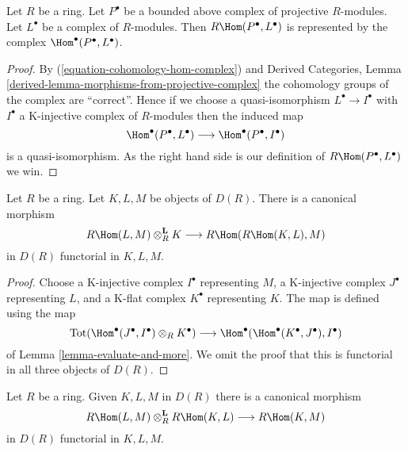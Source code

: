 \begin{lemma}
\label{lemma-RHom-out-of-projective}
Let $R$ be a ring. Let $P^\bullet$ be a bounded above complex
of projective $R$-modules. Let $L^\bullet$ be a complex of $R$-modules.
Then $R\Hom(P^\bullet, L^\bullet)$ is represented by the complex
$\Hom^\bullet(P^\bullet, L^\bullet)$.
\end{lemma}

\begin{proof}
By (\ref{equation-cohomology-hom-complex}) and
Derived Categories, Lemma \ref{derived-lemma-morphisms-from-projective-complex}
the cohomology groups of the complex are ``correct''.
Hence if we choose a quasi-isomorphism $L^\bullet \to I^\bullet$
with $I^\bullet$ a K-injective complex of $R$-modules
then the induced map
$$
\Hom^\bullet(P^\bullet, L^\bullet)
\longrightarrow
\Hom^\bullet(P^\bullet, I^\bullet)
$$
is a quasi-isomorphism. As the right hand side is our definition
of $R\Hom(P^\bullet, L^\bullet)$ we win.
\end{proof}

\begin{lemma}
\label{lemma-internal-hom-evaluate}
Let $R$ be a ring. Let $K, L, M$ be objects of $D(R)$.
There is a canonical morphism
$$
R\Hom(L, M) \otimes_R^\mathbf{L} K
\longrightarrow
R\Hom(R\Hom(K, L), M)
$$
in $D(R)$ functorial in $K, L, M$.
\end{lemma}

\begin{proof}
Choose
a K-injective complex $I^\bullet$ representing $M$,
a K-injective complex $J^\bullet$ representing $L$, and
a K-flat complex $K^\bullet$ representing $K$.
The map is defined using the map
$$
\text{Tot}(\Hom^\bullet(J^\bullet, I^\bullet) \otimes_R K^\bullet)
\longrightarrow
\Hom^\bullet(\Hom^\bullet(K^\bullet, J^\bullet), I^\bullet)
$$
of Lemma \ref{lemma-evaluate-and-more}. We omit the proof that
this is functorial in all three objects of $D(R)$.
\end{proof}

\begin{lemma}
\label{lemma-internal-hom-composition}
Let $R$ be a ring. Given $K, L, M$ in $D(R)$ there is a canonical morphism
$$
R\Hom(L, M) \otimes_R^\mathbf{L} R\Hom(K, L) \longrightarrow R\Hom(K, M)
$$
in $D(R)$ functorial in $K, L, M$.
\end{lemma}

